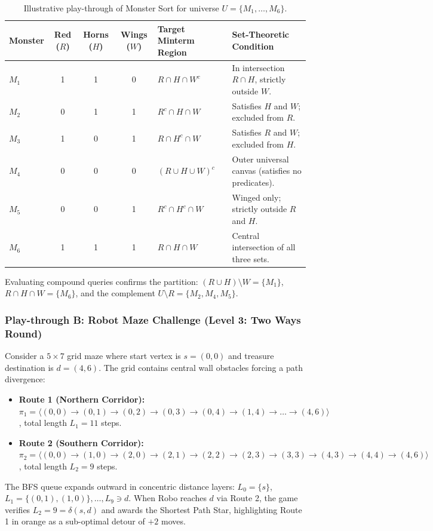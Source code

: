 \documentclass[11pt,a4paper]{article}
\begin{document}
\begin{table}[htbp]
\centering
\small
\caption{Illustrative play-through of Monster Sort for universe $U = \{M_1, \dots, M_6\}$.}
\label{tab:monstersort_playthrough}
\begin{tabularx}{\textwidth}{@{}l ccc Y Y@{}}
\toprule
\textbf{Monster} & \textbf{Red ($R$)} & \textbf{Horns ($H$)} & \textbf{Wings ($W$)} & \textbf{Target Minterm Region} & \textbf{Set-Theoretic Condition} \\
\midrule
$M_1$ & 1 & 1 & 0 & $R \cap H \cap W^c$ & In intersection $R \cap H$, strictly outside $W$. \\
$M_2$ & 0 & 1 & 1 & $R^c \cap H \cap W$ & Satisfies $H$ and $W$; excluded from $R$. \\
$M_3$ & 1 & 0 & 1 & $R \cap H^c \cap W$ & Satisfies $R$ and $W$; excluded from $H$. \\
$M_4$ & 0 & 0 & 0 & $(R \cup H \cup W)^c$ & Outer universal canvas (satisfies no predicates). \\
$M_5$ & 0 & 0 & 1 & $R^c \cap H^c \cap W$ & Winged only; strictly outside $R$ and $H$. \\
$M_6$ & 1 & 1 & 1 & $R \cap H \cap W$ & Central intersection of all three sets. \\
\bottomrule
\end{tabularx}
\end{table}

Evaluating compound queries confirms the partition: $(R \cup H) \setminus W = \{M_1\}$, $R \cap H \cap W = \{M_6\}$, and the complement $U \setminus R = \{M_2, M_4, M_5\}$.

\subsubsection*{Play-through B: Robot Maze Challenge (Level 3: Two Ways Round)}
Consider a $5 \times 7$ grid maze where start vertex is $s = (0, 0)$ and treasure destination is $d = (4, 6)$. The grid contains central wall obstacles forcing a path divergence:
\begin{itemize}
  \item \textbf{Route 1 (Northern Corridor):} $\pi_1 = \langle (0,0) \to (0,1) \to (0,2) \to (0,3) \to (0,4) \to (1,4) \to \dots \to (4,6) \rangle$, total length $L_1 = 11$ steps.
  \item \textbf{Route 2 (Southern Corridor):} $\pi_2 = \langle (0,0) \to (1,0) \to (2,0) \to (2,1) \to (2,2) \to (2,3) \to (3,3) \to (4,3) \to (4,4) \to (4,6) \rangle$, total length $L_2 = 9$ steps.
\end{itemize}
The BFS queue expands outward in concentric distance layers: $L_0 = \{s\}$, $L_1 = \{(0,1), (1,0)\}, \dots, L_9 \ni d$. When Robo reaches $d$ via Route 2, the game verifies $L_2 = 9 = \delta(s, d)$ and awards the Shortest Path Star, highlighting Route 1 in orange as a sub-optimal detour of $+2$ moves.
\end{document}
